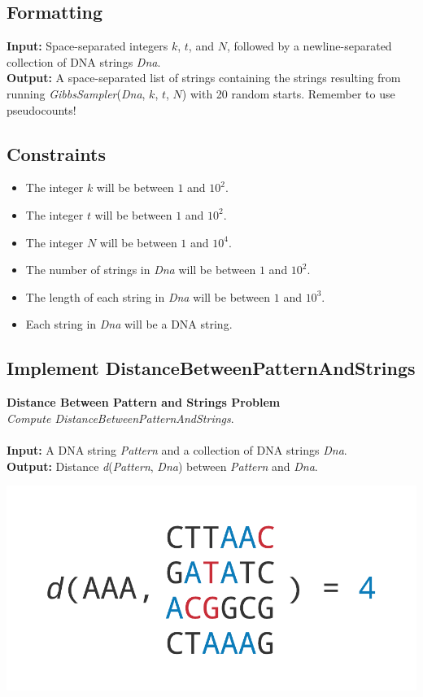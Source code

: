 \documentclass{article}
\begin{document}
\subsection*{Formatting}
\noindent\textbf{Input:} Space-separated integers $k$, $t$, and $N$, followed by a newline-separated collection of DNA strings \emph{Dna}.\\
\noindent\textbf{Output:} A space-separated list of strings containing the strings resulting from running \emph{GibbsSampler}(\emph{Dna}, $k$, $t$, $N$) with 20 random starts. Remember to use pseudocounts!

\subsection*{Constraints}
\begin{itemize}
    \item The integer $k$ will be between $1$ and $10^2$.
    \item The integer $t$ will be between $1$ and $10^2$.
    \item The integer $N$ will be between $1$ and $10^4$.
    \item The number of strings in \emph{Dna} will be between $1$ and $10^2$.
    \item The length of each string in \emph{Dna} will be between $1$ and $10^3$.
    \item Each string in \emph{Dna} will be a DNA string.
\end{itemize}
\pagebreak
\subsection{Implement DistanceBetweenPatternAndStrings}
\hline\vspace{5}
\noindent\textbf{Distance Between Pattern and Strings Problem}\\
\emph{Compute DistanceBetweenPatternAndStrings}.\\ \\
\noindent\textbf{Input:} A DNA string \emph{Pattern} and a collection of DNA strings \emph{Dna}.\\
\noindent\textbf{Output:} Distance \emph{d}(\emph{Pattern}, \emph{Dna}) between \emph{Pattern} and \emph{Dna}.
\begin{center}
    \includegraphics[scale=0.2]{c2/logos/2H.png} 
\end{center}
\hline\vspace{5}
\end{document}
